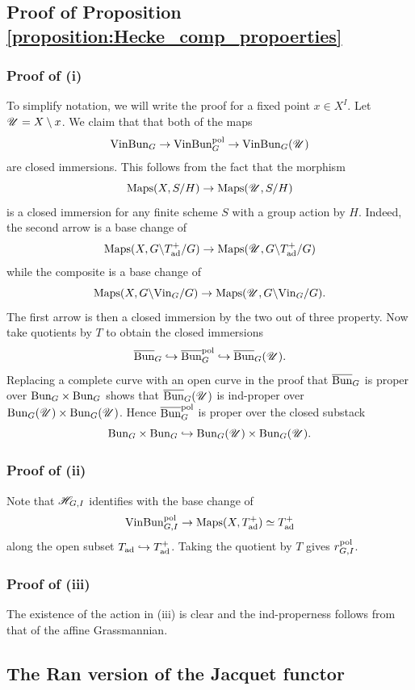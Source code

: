\subsection{Proof of Proposition \ref{proposition:Hecke_comp_propoerties}}

\subsubsection{Proof of (i)} To simplify notation, we will write the proof for a fixed point $x \in X^I$. Let $\mathscr{U} = X \setminus x$. We claim that that both of the maps
    \[
    \mathrm{Vin}\mathrm{Bun}_G \to \mathrm{Vin}\mathrm{Bun}_G^{\mathrm{pol}} \to \mathrm{Vin}\mathrm{Bun}_G(\mathscr{U})
    \]
are closed immersions. This follows from the fact that the morphism
    \[\mathrm{Maps}(X, S/H) \to \mathrm{Maps}(\mathscr{U}, S/H)\]
is a closed immersion for any finite scheme $S$ with a group action by $H$. Indeed, the second arrow is a base change of
    \[\mathrm{Maps}(X, G \backslash T_{\mathrm{ad}}^+ / G) \to \mathrm{Maps}(\mathscr{U}, G \backslash T_{\mathrm{ad}}^+ / G)\]
while the composite is a base change of
    \[\mathrm{Maps}(X, G \backslash \mathrm{Vin}_G / G) \to \mathrm{Maps}(\mathscr{U}, G \backslash \mathrm{Vin}_G / G).\]
The first arrow is then a closed immersion by the two out of three property. Now take quotients by $T$ to obtain the closed immersions
    \[\overline{\mathrm{Bun}}_G \hookrightarrow \overline{\mathrm{Bun}}_G^{\mathrm{pol}} \hookrightarrow \overline{\mathrm{Bun}}_G(\mathscr{U}).\]
Replacing a complete curve with an open curve in the proof \cite[Appendix A]{VinGr} that $\overline{\mathrm{Bun}}_G$ is proper over $\mathrm{Bun}_G \times \mathrm{Bun}_G$ shows that $\overline{\mathrm{Bun}}_G(\mathscr{U})$ is ind-proper over $\mathrm{Bun}_G(\mathscr{U}) \times \mathrm{Bun}_G(\mathscr{U})$. Hence $\overline{\mathrm{Bun}}_G^{\mathrm{pol}}$ is proper over the closed substack
    \[\mathrm{Bun}_G \times \mathrm{Bun}_G \hookrightarrow \mathrm{Bun}_G(\mathscr{U}) \times \mathrm{Bun}_G(\mathscr{U}).\]

\subsubsection{Proof of (ii)} Note that $\mathscr{H}_{G,I}$ identifies with the base change of
    \[\mathrm{Vin}\mathrm{Bun}_{G,I}^{\mathrm{pol}} \to \mathrm{Maps}(X, T_{\mathrm{ad}}^+) \simeq T_{\mathrm{ad}}^+\]
along the open subset $T_{\mathrm{ad}} \hookrightarrow T_{\mathrm{ad}}^+$. Taking the quotient by $T$ gives $r_{G,I}^{\mathrm{pol}}$.

\subsubsection{Proof of (iii)} The existence of the action in (iii) is clear and the ind-properness follows from that of the affine Grassmannian.

\subsection{The Ran version of the Jacquet functor}

